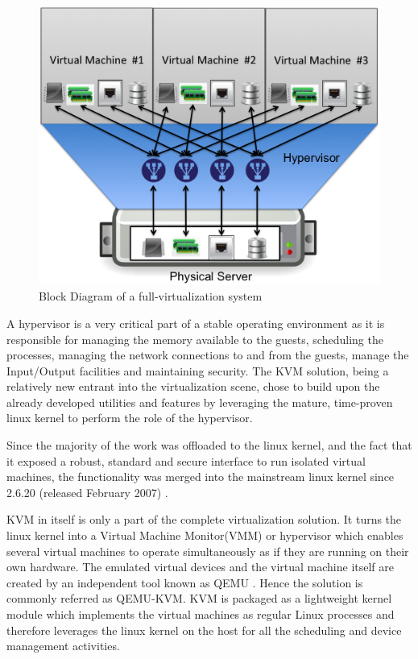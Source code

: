 \begin{figure}[htbp]
\centering
\includegraphics[width=120mm]{full-virt.png}
\caption{Block Diagram of a full-virtualization system}
\label{img_full_virt}
\end{figure}
A hypervisor is a very critical part of a stable operating environment as it is responsible for managing the memory available to the guests, scheduling the processes, managing the network connections to and from the guests, manage the Input/Output facilities and maintaining security. The KVM solution, being a relatively new entrant into the virtualization scene, chose to build upon the already developed utilities and features by leveraging the mature, time-proven linux kernel to perform the role of the hypervisor. 

Since the majority of the work was offloaded to the linux kernel, and the fact that it exposed a robust, standard and secure interface to run isolated virtual machines, the functionality was merged into the mainstream linux kernel since 2.6.20 (released February 2007) \cite{kvm_linux_kernel}.

KVM in itself is only a part of the complete virtualization solution. It turns the linux kernel into a Virtual Machine Monitor(VMM) or hypervisor which enables several virtual machines to operate simultaneously as if they are running on their own hardware. The emulated virtual devices and the virtual machine itself are created by an independent tool known as QEMU \cite{qemu}. Hence the solution is commonly referred as QEMU-KVM. KVM is packaged as a lightweight kernel module which implements the virtual machines as regular Linux processes and therefore leverages the linux kernel on the host for all the scheduling and device management activities. 




